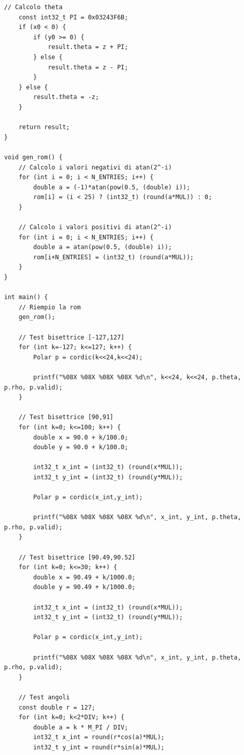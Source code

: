 \documentclass[12pt,a4paper]{report}
\begin{document}
\begin{itemize}
\begin{lstlisting}[caption={Test-data generation}]
    // Calcolo theta
    const int32_t PI = 0x03243F6B;
    if (x0 < 0) {
        if (y0 >= 0) {
            result.theta = z + PI;
        } else {
            result.theta = z - PI;
        }
    } else {
        result.theta = -z;
    }
    
    return result;
}

void gen_rom() {
    // Calcolo i valori negativi di atan(2^-i)
    for (int i = 0; i < N_ENTRIES; i++) {
        double a = (-1)*atan(pow(0.5, (double) i));
        rom[i] = (i < 25) ? (int32_t) (round(a*MUL)) : 0;
    }
    
    // Calcolo i valori positivi di atan(2^-i)
    for (int i = 0; i < N_ENTRIES; i++) {
        double a = atan(pow(0.5, (double) i));
        rom[i+N_ENTRIES] = (int32_t) (round(a*MUL));
    }
}

int main() {
    // Riempio la rom
    gen_rom();
    
    // Test bisettrice [-127,127]
    for (int k=-127; k<=127; k++) {
        Polar p = cordic(k<<24,k<<24);
        
        printf("%08X %08X %08X %08X %d\n", k<<24, k<<24, p.theta, p.rho, p.valid);
    }
    
    // Test bisettrice [90,91]
    for (int k=0; k<=100; k++) {
        double x = 90.0 + k/100.0;
        double y = 90.0 + k/100.0;
        
        int32_t x_int = (int32_t) (round(x*MUL));
        int32_t y_int = (int32_t) (round(y*MUL));
        
        Polar p = cordic(x_int,y_int);
        
        printf("%08X %08X %08X %08X %d\n", x_int, y_int, p.theta, p.rho, p.valid);
    }
    
    // Test bisettrice [90.49,90.52]
    for (int k=0; k<=30; k++) {
        double x = 90.49 + k/1000.0;
        double y = 90.49 + k/1000.0;
        
        int32_t x_int = (int32_t) (round(x*MUL));
        int32_t y_int = (int32_t) (round(y*MUL));
        
        Polar p = cordic(x_int,y_int);
        
        printf("%08X %08X %08X %08X %d\n", x_int, y_int, p.theta, p.rho, p.valid);
    }
    
    // Test angoli
    const double r = 127;
    for (int k=0; k<2*DIV; k++) {
        double a = k * M_PI / DIV;
        int32_t x_int = round(r*cos(a)*MUL);
        int32_t y_int = round(r*sin(a)*MUL);
        

\end{lstlisting}
\end{itemize}
\end{document}

